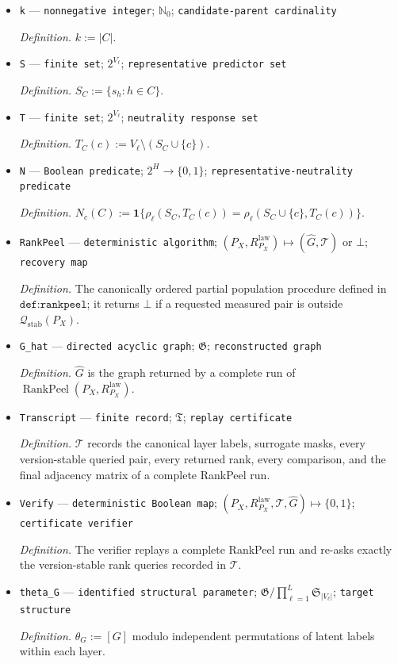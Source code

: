 \documentclass{article}
\begin{document}
\begin{itemize}
  \item \texttt{k} --- \texttt{nonnegative integer}; \(\mathbb N_0\); \texttt{candidate-\allowbreak{}parent cardinality}
  \par\smallskip\noindent\emph{Definition.} \(k:=|C|\).
  \item \texttt{S} --- \texttt{finite set}; \(2^{V_\ell}\); \texttt{representative predictor set}
  \par\smallskip\noindent\emph{Definition.} \(S_C:=\{s_h:h\in C\}\).
  \item \texttt{T} --- \texttt{finite set}; \(2^{V_\ell}\); \texttt{neutrality response set}
  \par\smallskip\noindent\emph{Definition.} \(T_C(c):=V_\ell\setminus(S_C\cup\{c\})\).
  \item \texttt{N} --- \texttt{Boolean predicate}; \(2^H\to\{0,1\}\); \texttt{representative-\allowbreak{}neutrality predicate}
  \par\smallskip\noindent\emph{Definition.} \(N_c(C):=\mathbf 1\{\rho_\ell(S_C,T_C(c))=\rho_\ell(S_C\cup\{c\},T_C(c))\}\).
  \item \texttt{RankPeel} --- \texttt{deterministic algorithm}; \((P_X,R^{\mathrm{law}}_{P_X})\mapsto(\widehat G,\mathcal T)\text{ or }\bot\); \texttt{recovery map}
  \par\smallskip\noindent\emph{Definition.} The canonically ordered partial population procedure defined in \(\texttt{def:rankpeel}\); it returns \(\bot\) if a requested measured pair is outside \(\mathcal Q_{\mathrm{stab}}(P_X)\).
  \item \texttt{G\_\allowbreak{}hat} --- \texttt{directed acyclic graph}; \(\mathfrak G\); \texttt{reconstructed graph}
  \par\smallskip\noindent\emph{Definition.} \(\widehat G\) is the graph returned by a complete run of \(\operatorname{RankPeel}(P_X,R^{\mathrm{law}}_{P_X})\).
  \item \texttt{Transcript} --- \texttt{finite record}; \(\mathfrak T\); \texttt{replay certificate}
  \par\smallskip\noindent\emph{Definition.} \(\mathcal T\) records the canonical layer labels, surrogate masks, every version-stable queried pair, every returned rank, every comparison, and the final adjacency matrix of a complete RankPeel run.
  \item \texttt{Verify} --- \texttt{deterministic Boolean map}; \((P_X,R^{\mathrm{law}}_{P_X},\mathcal T,\widehat G)\mapsto\{0,1\}\); \texttt{certificate verifier}
  \par\smallskip\noindent\emph{Definition.} The verifier replays a complete RankPeel run and re-asks exactly the version-stable rank queries recorded in \(\mathcal T\).
  \item \texttt{theta\_\allowbreak{}G} --- \texttt{identified structural parameter}; \(\mathfrak G/\prod_{\ell=1}^{L}\mathfrak S_{|V_\ell|}\); \texttt{target structure}
  \par\smallskip\noindent\emph{Definition.} \(\theta_G:=[G]\) modulo independent permutations of latent labels within each layer.
\end{itemize}
\end{document}
